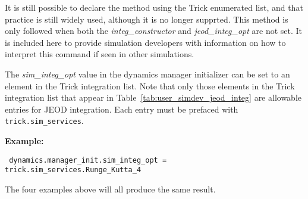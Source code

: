 It is still possible to declare the method using the Trick enumerated list, 
and that practice is still widely used, although it is no longer supprted.  
This 
method is only followed when both the \textit{integ\_constructor} and 
\textit{jeod\_integ\_opt} are not set.  It is 
included here to provide simulation developers with information on how to 
interpret this command if seen in other simulations.

The \textit{sim\_integ\_opt} value in the dynamics manager initializer can be 
set to an element in the Trick integration list.  Note that only those 
elements in the Trick integration list that appear in 
Table~\ref{tab:user_simdev_jeod_integ} are allowable entries for JEOD 
integration.  Each entry must be prefaced with \verb+trick.sim_services+.

\textbf{Example:}
\begin{verbatim}
 dynamics.manager_init.sim_integ_opt = trick.sim_services.Runge_Kutta_4
\end{verbatim}

The four examples above will all produce the same result.


